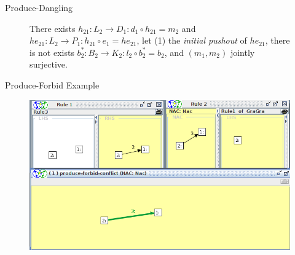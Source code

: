 \documentclass[xcolor=dvipsnames,pdf,11pt,handout]{beamer}
\begin{document}
\begin{frame}[fragile]{Produce-Dangling}{}

\footnotesize
\centerline{
}

\begin{figure}[h]
  \begin{minipage}{0.55\linewidth}
   There exists $h_{21}: L_2 \rightarrow D_1 : d_1 \circ h_{21} = m_2$ and $he_{21} : L_2 \rightarrow P_1 : h_{21} \circ e_1 = he_{21}$, let (1) the \emph{initial pushout} of $he_{21}$, there is not exists $b_2^* : B_2 \rightarrow K_2 : l_2 \circ b_2^* = b_2$, and $\left(m_1,m_2\right)$ jointly surjective.
  \vspace{4ex}
  \end{minipage}
  \hspace{0.1\linewidth}
  \begin{minipage}{0.35\linewidth}
    \centering
  \vspace{4ex}
  \end{minipage}
\end{figure}

\end{frame}

\begin{frame}{Produce-Forbid Example}{}

\begin{figure}
\includegraphics[width=\textwidth]{pf}
\end{figure}

\end{frame}
\end{document}
